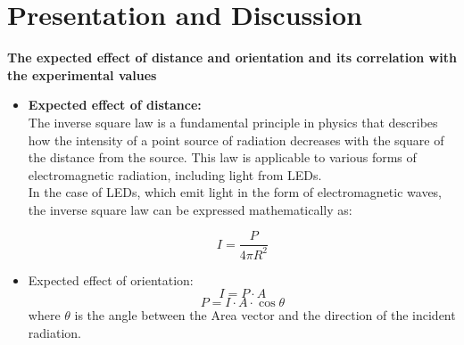 \chapter{Presentation and Discussion}

\textbf{The expected effect of distance and orientation and its correlation with the experimental values}
\begin{itemize} 
\item \textbf{Expected effect of distance:} 
\smallskip 
\\ 
The inverse square law is a fundamental principle in physics that describes how the intensity of a point source of radiation decreases with the square of the distance from the source. This law is applicable to various forms of electromagnetic radiation, including light from LEDs.\\
In the case of LEDs, which emit light in the form of electromagnetic waves, the inverse square law can be expressed mathematically as: 

\[I = \frac{P}{4\pi R^2}\]

\item Expected effect of orientation:\\
\[I = P \cdot A\] \[P  = I \cdot A \cdot \cos \theta\] 
where $\theta$ is the angle between the Area vector and the direction of the incident radiation.\\ 
\end{itemize} 

